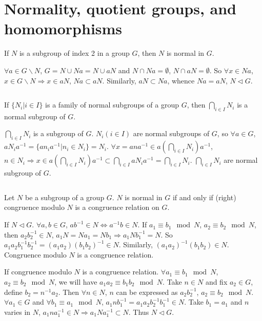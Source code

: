\section{Normality, quotient groups, and homomorphisms}
\begin{ex}
    If $N$ is a subgroup of index 2 in a group $G$, then $N$ is normal in $G$.
\end{ex}

\begin{answer}
    $\forall a\in G\backslash N$, $G=N\cup Na=N\cup aN$ and $N\cap Na=\emptyset$, $N\cap aN=\emptyset$. So $\forall x\in Na$, $x\in G\backslash N\Rightarrow x\in aN$, $Na\subset aN$. Similarly, $aN\subset Na$, whence $Na=aN$, $N\lhd G$.
\end{answer}

$$ $$

\begin{ex}
    If $\{N_{i}|i\in I\}$ is a family of normal subgroups of a group $G$, then $\bigcap\limits_{i\in I}N_{i}$ is a normal subgroup of $G$.
\end{ex}

\begin{answer}
    $\bigcap\limits_{i\in I}N_{i}$ is a subgroup of $G$. $N_{i} (i\in I)$ are normal subgroups of $G$, so $\forall a\in G$, $aN_{i}a^{-1}=\{an_{i}a^{-1}|n_{i}\in N_{i}\}=N_{i}$. $\forall x=ana^{-1}\in a(\bigcap\limits_{i\in I}N_{i})a^{-1}$, $n\in N_{i}\Rightarrow x\in a(\bigcap\limits_{i\in I}N_{i})a^{-1}\subset \bigcap\limits_{i\in I}aN_{i}a^{-1}=\bigcap\limits_{i\in I}N_{i}$. $\bigcap\limits_{i\in I}N_{i}$ are normal subgroup of $G$.
\end{answer}

$$ $$

\begin{ex}
    Let $N$ be a subgroup of a group $G$. $N$ is normal in $G$ if and only if (right) congruence modulo $N$ is a congruence relation on $G$.
\end{ex}

\begin{answer}
    If $N\lhd G$. $\forall a,b\in G$, $ab^{-1}\in N\Leftrightarrow a^{-1}b\in N$. If $a_{1}\equiv b_{1}\mod N$, $a_{2}\equiv b_{2}\mod N$, then $a_{2}b_{2}^{-1}\in N$, $a_{1}N=Na_{1}=Nb_{1}\Rightarrow a_{1}Nb_{1}^{-1}=N$. So $a_{1}a_{2}b_{1}^{-1}b_{2}^{-1}=(a_{1}a_{2})(b_{1}b_{2})^{-1}\in N$. Similarly, $(a_{1}a_{2})^{-1}(b_{1}b_{2})\in N$. Congruence modulo $N$ is a congruence relation.

    If congruence modulo $N$ is a congruence relation. $\forall a_{1}\equiv b_{1}\mod N$, $a_{2}\equiv b_{2}\mod N$, we will have $a_{1}a_{2}\equiv b_{1}b_{2}\mod N$. Take $n\in N$ and fix $a_{2}\in G$, define $b_{2}=n^{-1}a_{2}$. Then $\forall n\in N$, $n$ can be expressed as $a_{2}b_{2}^{-1}$, $a_{2}\equiv b_{2}\mod N$. $\forall a_{1}\in G$ and $\forall b_{1}\equiv a_{1}\mod N$, $a_{1}nb_{1}^{-1}=a_{1}a_{2}b_{2}^{-1}b_{1}^{-1}\in N$. Take $b_{1}=a_{1}$ and $n$ varies in $N$, $a_{1}na_{1}^{-1}\in N\Rightarrow a_{1}Na_{1}^{-1}\subset N$. Thus $N\lhd G$.
\end{answer}

